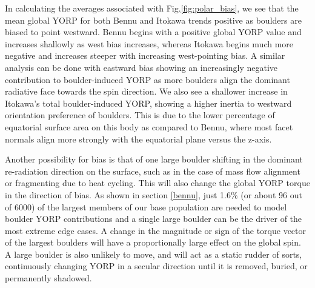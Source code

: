 In calculating the averages associated with Fig.\ref{fig:polar_bias}, we see that the mean global YORP for both Bennu and Itokawa trends positive as boulders are biased to point westward. Bennu begins with a positive global YORP value and increases shallowly as west bias increases, whereas Itokawa begins much more negative and increases steeper with increasing west-pointing bias. A similar analysis can be done with eastward bias showing an increasingly negative contribution to boulder-induced YORP as more boulders align the dominant radiative face towards the spin direction.  We also see a shallower increase in Itokawa's total boulder-induced YORP, showing a higher inertia to westward orientation preference of boulders. This is due to the lower percentage of equatorial surface area on this body as compared to Bennu, where most facet normals align more strongly with the equatorial plane versus the z-axis.

Another possibility for bias is that of one large boulder shifting in the dominant re-radiation direction on the surface, such as in the case of mass flow alignment or fragmenting due to heat cycling. This will also change the global YORP torque in the direction of bias. As shown in section \ref{bennu}, just 1.6\% (or about 96 out of 6000) of the largest members of our base population are needed to model boulder YORP contributions and a single large boulder can be the driver of the most extreme edge cases. A change in the magnitude or sign of the torque vector of the largest boulders will have a proportionally large effect on the global spin. A large boulder is also unlikely to move, and will act as a static rudder of sorts, continuously changing YORP in a secular direction until it is removed, buried, or permanently shadowed. 


